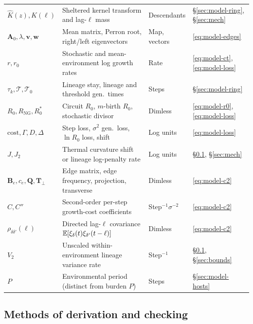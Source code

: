 \begin{table}[t]
{\begin{tabular*}{\textwidth}{@{\extracolsep{\fill}}llll@{}}
$\widehat{K}(z), K(\ell)$ & Sheltered kernel transform and lag-$\ell$ mass & Descendants & \S\ref{sec:model-ring}, \S\ref{sec:mech} \\
$\mathbf{A}_0, \lambda, \mathbf{v}, \mathbf{w}$ & Mean matrix, Perron root, right/left eigenvectors & Map, vectors & \eqref{eq:model-edges} \\
$r, r_0$ & Stochastic and mean-environment log growth rates & Rate & \eqref{eq:model-ct}, \eqref{eq:model-loss} \\
$\tau_k, \mathcal{T}, \mathcal{T}_0$ & Lineage stay, lineage and threshold gen.\ times & Steps & \S\ref{sec:model-ring} \\
$R_0, R_{\mathrm{NG}}, R_0^*$ & Circuit $R_0$, $m$-birth $R_0$, stochastic divisor & Dimless & \eqref{eq:model-r0}, \eqref{eq:model-loss} \\
$\mathrm{cost}, \Gamma, D, \Delta$ & Step loss, $\sigma^2$ gen.\ loss, $\ln R_0$ loss, shift & Log units & \eqref{eq:model-loss} \\
$J, J_2$ & Thermal curvature shift or lineage log-penalty rate & Log units & \S\ref{sec:model-methods}, \S\ref{sec:mech} \\
$\mathbf{B}_e, c_e, \mathbf{Q}, \mathbf{T}_\perp$ & Edge matrix, edge frequency, projection, transverse & Dimless & \eqref{eq:model-c2} \\
$C, C''$ & Second-order per-step growth-cost coefficients & Step$^{-1}\sigma^{-2}$ & \eqref{eq:model-c2} \\
$\rho_{\delta\delta'}(\ell)$ & Directed lag-$\ell$ covariance $\mathbb{E}[\xi_\delta(t)\xi_{\delta'}(t-\ell)]$ & Dimless & \eqref{eq:model-c2} \\
$V_2$ & Unscaled within-environment lineage variance rate & Step$^{-1}$ & \S\ref{sec:model-methods}, \S\ref{sec:bounds} \\
$P$ & Environmental period (distinct from burden $P$) & Steps & \S\ref{sec:model-hosts} \\
\bottomrule
\end{tabular*}}
\end{table}

\subsection{Methods of derivation and checking}\label{sec:model-methods}

